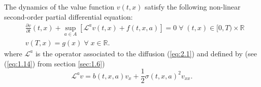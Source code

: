 \begin{theorem}
    The dynamics of the value function $v(t,x)$ satisfy the following non-linear
    second-order partial differential equation:
    \begin{equation}\label{eq:2.19}
        \begin{aligned}
            &\frac{\partial v}{\partial t}(t,x)+\sup_{a\in A}\left[\mathcal{L}^av(t,x)+f(t,x,a)\right]=0\;\forall\;(t,x)\in[0,T)\times\mathbb{R}\\
            &v(T,x)=g(x)\;\forall\;x\in\mathbb{R}.
        \end{aligned}
    \end{equation}
    where $\mathcal{L}^a$ is the operator associated to the diffusion (\ref{eq:2.1})
    and defined by (see (\ref{eq:1.14}) from section \ref{sec:1.6})
    \begin{equation*}
        \mathcal{L}^av=b(t,x,a)v_x+\frac{1}{2}\sigma(t,x,a)^2v_{xx}.
    \end{equation*}
\end{theorem}
